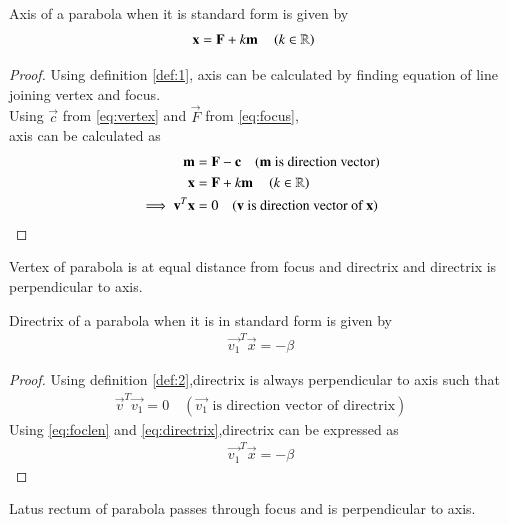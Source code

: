 \documentclass[journal,12pt,twocolumn]{IEEEtran}
\begin{document}
\begin{lemma}
Axis of a parabola when it is standard form is given by
\begin{align}
    \mathbf{x} &= \mathbf{F}+k\mathbf{m} \quad \left(k \in \mathbb{R}\right) \label{eq:axis}
\end{align}
\end{lemma}

\begin{proof}
Using definition \ref{def:1}, axis can be calculated by finding equation of line joining vertex and focus.
\\
Using $\vec{c}$ from \eqref{eq:vertex} and $\vec{F}$ from \eqref{eq:focus},
\\
axis can be calculated as
\begin{align}
\mathbf{m} &= \mathbf{F}-\mathbf{c} \quad (\text{$\mathbf{m}$ is direction vector})
\\
\mathbf{x} &= \mathbf{F}+k\mathbf{m} \quad \left(k \in \mathbb{R}\right) 
\\
\implies \mathbf{v}^T\mathbf{x} &= 0 \quad (\text{$\mathbf{v}$ is direction vector of $\mathbf{x}$}) \label{eq:vecaxis}
\end{align}
\end{proof}

\begin{definition}
Vertex  of  parabola  is  at  equal  distance  from focus and directrix and directrix is perpendicular to axis. \label{def:2}
\end{definition}

\begin{lemma}
Directrix of a parabola when it is in standard form is given by
\begin{align}
    \vec{v_1}^T\vec{x} = -\beta 
\end{align}
\end{lemma}

\begin{proof}
Using definition \ref{def:2},directrix is always perpendicular to axis such that
\begin{align}
\vec{v}^T\vec{v_1} = 0 \quad (\text{$\vec{v_1}$ is direction vector of directrix}) \label{eq:directrix}
\end{align}
Using \eqref{eq:foclen} and \eqref{eq:directrix},directrix can be expressed as 
\begin{align}
    \vec{v_1}^T\vec{x} = -\beta 
\end{align}
\end{proof}

\begin{definition}
Latus rectum of parabola passes through focus and is perpendicular to axis. \label{def:3}
\end{definition}
\end{document}
